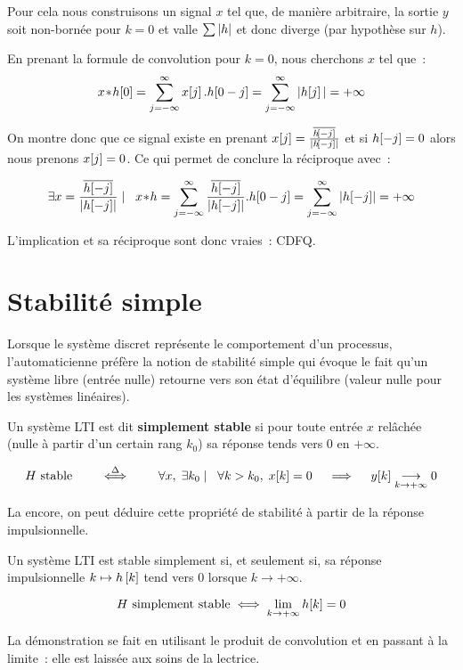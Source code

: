 \begin{demo}
  Pour cela nous construisons un signal $x$ tel que, de manière
  arbitraire, la sortie $y$ soit non-bornée pour $k=0$ et valle
  $\sum\left|h\right|$ et donc diverge (par hypothèse sur $h$).
  
  En prenant la formule de convolution pour $k=0$, nous cherchons
  $x$ tel que~:
  $$ x\!\ast\! h\!\left[0\right]= \sum\limits_{j=-\infty}^{\infty}{x\!\left[j\right].h\!\left[0-j\right]} =  \sum\limits_{j=-\infty}^{\infty}{|h\!\left[j\right]|} = +\infty$$
  
  On montre donc que ce signal existe en prenant
  $x[j]=\frac{\overline{h\!\left[-j\right]}}{\left|h\!\left[-j\right]\right|}$ et si
  $h\!\left[-j\right]=0$ alors nous prenons $x\!\left[j\right]=0$.  Ce qui permet de
  conclure la réciproque avec~:
  
  $$\exists x=\frac{\overline{h\ded{-j}}}{\abs{h\ded{-j}}} \tq x\conv h = \somme{j=-\infty}{\infty}{\frac{\overline{h\ded{-j}}}{\abs{h\ded{-j}}}.h\ded{0-j}}= \somme{j=-\infty}{\infty}{\abs{h\ded{-j}}}=+\infty$$

  L'implication et sa réciproque sont donc vraies~: CDFQ.
  
\end{demo}


\section{Stabilité simple}
Lorsque le système discret représente le comportement d'un processus,
l'automaticienne préfère la notion de stabilité simple qui évoque le
fait qu'un système libre (entrée nulle) retourne vers son état
d'équilibre (valeur nulle pour les systèmes linéaires).

\begin{definition} Un système LTI est dit \textbf{simplement stable}
  si pour toute entrée $x$ relâchée (nulle à partir d'un certain rang
  $k_0$) sa réponse tends vers 0 en $+\infty$.

  $$H \text{ stable}\quad\quad \overset{\Delta}{\iff}\quad \quad\forall x,\; \exists k_0 \mathrel{}\mid\mathrel{} \;\;{} \forall k>k_0, \; x\!\left[k\right]=0 \quad\implies\quad y\!\left[k\right] \underset{k\to+\infty}{\longrightarrow} 0  $$
\end{definition}

La encore, on peut déduire cette propriété de stabilité à partir de la
réponse impulsionnelle.

\begin{theoreme}
  Un système LTI est stable simplement si, et seulement si, sa réponse
  impulsionnelle $k\mapsto h\left[k\right]$ tend vers 0 lorsque $k\to +\infty$.
  
  $$ H \text{ simplement stable} \iff \lim_{k\to+\infty} h\!\left[k\right] = 0 $$
\end{theoreme}


La démonstration se fait en utilisant le produit de convolution et en
passant à la limite~: elle est laissée aux soins de la lectrice.







